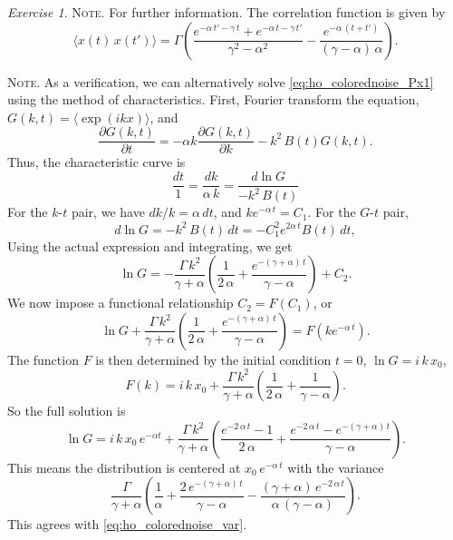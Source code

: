 \documentclass{book}
\numberwithin{equation}{section}
\theoremstyle{plain}
\theoremstyle{definition}
\theoremstyle{remark}
\newtheorem{exercise}{Exercise}
\newcommand{\note}[1]{{\color{DarkGreen}\footnotesize \textsc{Note.} #1}}
\begin{document}
\begin{exercise}
  \note{
    For further information.
    The correlation function is given by
    $$
    \langle x(t) \, x(t') \rangle
    =
    \Gamma \left(
      \frac{ e^{-\alpha \, t' - \gamma \, t} + e^{-\alpha \, t - \gamma \, t' }  }
      { \gamma^2 - \alpha^2 }
      -
      \frac{ e^{ -\alpha \, (t + t') } } { (\gamma - \alpha) \, \alpha }
    \right).
    $$
  }

  \note{
    As a verification,
    we can alternatively solve \eqref{eq:ho_colorednoise_Px1} using
    the method of characteristics.
    First, Fourier transform the equation,
    $G(k,t) = \langle \exp(ikx) \rangle$,
    and
    $$
    \frac{ \partial G(k, t) } { \partial t }
    =
    -\alpha k \frac{ \partial G(k, t) } { \partial k }
    - k^2 \, B(t) G(k, t).
    $$
    Thus, the characteristic curve is
    $$
    \frac{ dt } { 1 }
    =
    \frac{ dk } { \alpha \, k }
    =
    \frac{ d\ln G } { -k^2 \, B(t) }
    $$
    For the $k$-$t$ pair, we have $dk/k = \alpha \, dt$,
    and $k e^{-\alpha \, t} = C_1$.
    For the $G$-$t$ pair,
    $$
    d\ln G = -k^2 \, B(t) \, dt = -C_1^2 e^{2\alpha\, t} B(t) \, dt,
    $$
    Using the actual expression and integrating, we get
    $$
    \ln G = -\frac{\Gamma \, k^2 }{ \gamma + \alpha }
    \left( \frac{1}{2 \, \alpha} + \frac{e^{-(\gamma + \alpha) \,t }}{\gamma - \alpha} \right)
    + C_2.
    $$
    We now impose a functional relationship $C_2 = F(C_1)$, or
    $$
    \ln G + \frac{\Gamma \, k^2 }{ \gamma + \alpha }
    \left( \frac{1}{2 \, \alpha} + \frac{e^{-(\gamma + \alpha) \,t }}{\gamma - \alpha} \right)
    = F(ke^{-\alpha \, t}).
    $$
    The function $F$ is then determined by the initial condition $t = 0$,
    $\ln G = i \, k \, x_0$,
    $$
    F(k) = i \, k \, x_0 + \frac{\Gamma \, k^2 }{ \gamma + \alpha }
    \left( \frac{1}{2 \, \alpha} + \frac{1}{\gamma - \alpha} \right).
    $$
    So the full solution is
    $$
    \ln G = i \, k \, x_0 \, e^{-\alpha t} + \frac{\Gamma \, k^2 }{ \gamma + \alpha }
    \left( \frac{e^{-2 \, \alpha \, t} - 1}{2 \, \alpha}
    + \frac{e^{-2 \, \alpha \, t} - e^{-(\gamma + \alpha) \, t} }{\gamma - \alpha} \right).
    $$
    This means the distribution is centered at $x_0 \, e^{-\alpha \, t}$
    with the variance
    $$
    \frac{\Gamma }{ \gamma + \alpha }
    \left( \frac{1}{\alpha}
    + \frac{ 2 \, e^{-(\gamma + \alpha) \, t} }{\gamma - \alpha}
    - \frac{ (\gamma + \alpha) \, e^{-2\, \alpha \, t} }{\alpha \, (\gamma - \alpha)} \right).
    $$
    This agrees with \eqref{eq:ho_colorednoise_var}.
  }

\end{exercise}
\end{document}
